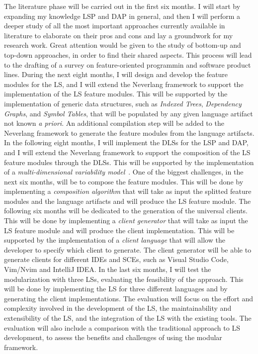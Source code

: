 The literature phase will be carried out in the first six months. I will start by expanding my knowledge LSP and DAP in general, and then I will perform a deeper study of all the most important approaches currently available in literature to elaborate on their pros and cons and lay a groundwork for my research work. Great attention would be given to the study of bottom-up and top-down approaches, in order to find their shared aspects. This process will lead to the drafting of a survey on feature-oriented programmin and software product lines.
During the next eight months, I will design and develop the feature modules for the LS, and I will extend the Neverlang framework to support the implementation of the LS feature modules. This will be supported by the implementation of generic data structures, such as \textit{Indexed Trees}, \textit{Dependency Graphs}, and \textit{Symbol Tables}, that will be populated by any given language artifact not known \textit{a priori}. An additional compilation step will be added to the Neverlang framework to generate the feature modules from the language artifacts.
In the following eight months, I will implement the DLSs for the LSP and DAP, and I will extend the Neverlang framework to support the composition of the LS feature modules through the DLSs. This will be supported by the implementation of a \textit{multi-dimensional variability model}~\cite{Rosenmuller11}.
One of the biggest challenges, in the next six months, will be to compose the feature modules. This will be done by implementing a \textit{composition algorithm} that will take as input the splitted feature modules and the language artifacts and will produce the LS feature module.
The following six months will be dedicated to the generation of the universal clients. This will be done by implementing a \textit{client generator} that will take as input the LS feature module and will produce the client implementation. This will be supported by the implementation of a \textit{client language} that will allow the developer to specify which client to generate. The client generator will be able to generate clients for different IDEs and SCEs, such as Visual Studio Code, Vim/Nvim and IntelliJ IDEA.
In the last six months, I will test the modularization with three LSs, evaluating the feasibility of the approach. This will be done by implementing the LS for three different languages and by generating the client implementations. The evaluation will focus on the effort and complexity involved in the development of the LS, the maintainability and extensibility of the LS, and the integration of the LS with the existing tools. The evaluation will also include a comparison with the traditional approach to LS development, to assess the benefits and challenges of using the modular framework.





